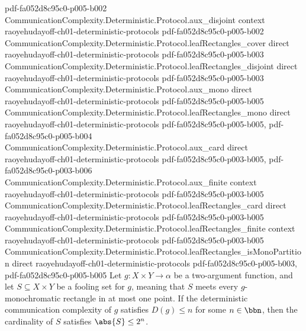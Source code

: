 \begin{theorem}
  {pdf-fa052d8c95c0-p005-b002}
\proofstep
  {CommunicationComplexity.Deterministic.Protocol.aux_disjoint}
  {context}
  {raoyehudayoff-ch01-deterministic-protocols}
  {pdf-fa052d8c95c0-p005-b002}
\proofstep
  {CommunicationComplexity.Deterministic.Protocol.leafRectangles_cover}
  {direct}
  {raoyehudayoff-ch01-deterministic-protocols}
  {pdf-fa052d8c95c0-p005-b003}
\proofstep
  {CommunicationComplexity.Deterministic.Protocol.leafRectangles_disjoint}
  {direct}
  {raoyehudayoff-ch01-deterministic-protocols}
  {pdf-fa052d8c95c0-p005-b003}
\proofstep
  {CommunicationComplexity.Deterministic.Protocol.aux_mono}
  {direct}
  {raoyehudayoff-ch01-deterministic-protocols}
  {pdf-fa052d8c95c0-p005-b005}
\proofstep
  {CommunicationComplexity.Deterministic.Protocol.leafRectangles_mono}
  {direct}
  {raoyehudayoff-ch01-deterministic-protocols}
  {pdf-fa052d8c95c0-p005-b005,
    pdf-fa052d8c95c0-p005-b004}
\proofstep
  {CommunicationComplexity.Deterministic.Protocol.aux_card}
  {direct}
  {raoyehudayoff-ch01-deterministic-protocols}
  {pdf-fa052d8c95c0-p003-b005,
    pdf-fa052d8c95c0-p003-b006}
\proofstep
  {CommunicationComplexity.Deterministic.Protocol.aux_finite}
  {context}
  {raoyehudayoff-ch01-deterministic-protocols}
  {pdf-fa052d8c95c0-p003-b005}
\proofstep
  {CommunicationComplexity.Deterministic.Protocol.leafRectangles_card}
  {direct}
  {raoyehudayoff-ch01-deterministic-protocols}
  {pdf-fa052d8c95c0-p003-b005}
\proofstep
  {CommunicationComplexity.Deterministic.Protocol.leafRectangles_finite}
  {context}
  {raoyehudayoff-ch01-deterministic-protocols}
  {pdf-fa052d8c95c0-p003-b005}
\proofstep
  {CommunicationComplexity.Deterministic.Protocol.leafRectangles_isMonoPartition}
  {direct}
  {raoyehudayoff-ch01-deterministic-protocols}
  {pdf-fa052d8c95c0-p005-b003,
    pdf-fa052d8c95c0-p005-b005}
Let $g : X \times Y \to \alpha$ be a two-argument function, and let $S \subseteq X
\times Y$ be a fooling set for $g$, meaning that $S$ meets every $g$-monochromatic
rectangle in at most one point. If the deterministic communication complexity of $g$
satisfies $D(g) \le n$ for some $n \in \bbn$, then the cardinality of $S$ satisfies
$\abs{S} \le 2^{n}$.
\end{theorem}

